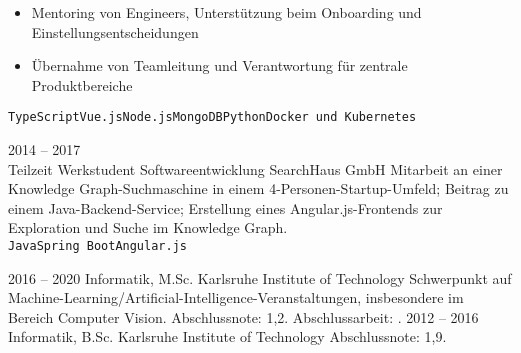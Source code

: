 \documentclass[8pt]{developercv} %
\newcommand{\linebreaksmall}{\vspace{2mm}}
\begin{document}
\begin{entrylist}
{\begin{itemize}[nosep, topsep=0pt, left=5pt, after=\vspace{6pt}]
			\item Mentoring von Engineers, Unterstützung beim Onboarding und Einstellungsentscheidungen
			\item Übernahme von Teamleitung und Verantwortung für zentrale Produktbereiche
		\end{itemize}
		 \texttt{TypeScript}\slashsep\texttt{Vue.js}\slashsep\texttt{Node.js}\slashsep\texttt{MongoDB}\slashsep\texttt{Python}\slashsep\texttt{Docker und Kubernetes}} \linebreaksmall
	\entry
		{2014 -- 2017\\\footnotesize{Teilzeit}}
		{Werkstudent Softwareentwicklung}
		{SearchHaus GmbH}
		{Mitarbeit an einer Knowledge Graph-Suchmaschine in einem 4-Personen-Startup-Umfeld; Beitrag zu einem Java-Backend-Service; Erstellung eines Angular.js-Frontends zur Exploration und Suche im Knowledge Graph.
		\linebreaksmall \\ \texttt{Java}\slashsep\texttt{Spring Boot}\slashsep\texttt{Angular.js}}
\end{entrylist}



\begin{entrylist}
	\entry
		{2016 -- 2020}
		{Informatik, M.Sc.}
		{Karlsruhe Institute of Technology}
		{Schwerpunkt auf Machine-Learning/Artificial-Intelligence-Veranstaltungen, insbesondere im Bereich Computer Vision. Abschlussnote: 1,2. Abschlussarbeit: .}
	\entry
		{2012 -- 2016}
		{Informatik, B.Sc.}
		{Karlsruhe Institute of Technology}
		{Abschlussnote: 1,9.}
\end{entrylist}

\end{document}
